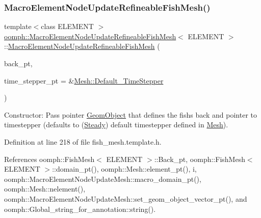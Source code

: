 \subsubsection{\texorpdfstring{Macro\+Element\+Node\+Update\+Refineable\+Fish\+Mesh()}{MacroElementNodeUpdateRefineableFishMesh()}}
{\footnotesize\ttfamily template$<$class E\+L\+E\+M\+E\+NT $>$ \\
\hyperlink{classoomph_1_1MacroElementNodeUpdateRefineableFishMesh}{oomph\+::\+Macro\+Element\+Node\+Update\+Refineable\+Fish\+Mesh}$<$ E\+L\+E\+M\+E\+NT $>$\+::\hyperlink{classoomph_1_1MacroElementNodeUpdateRefineableFishMesh}{Macro\+Element\+Node\+Update\+Refineable\+Fish\+Mesh} (\begin{DoxyParamCaption}\item[{\hyperlink{classoomph_1_1GeomObject}{Geom\+Object} $\ast$}]{back\+\_\+pt,  }\item[{\hyperlink{classoomph_1_1TimeStepper}{Time\+Stepper} $\ast$}]{time\+\_\+stepper\+\_\+pt = {\ttfamily \&\hyperlink{classoomph_1_1Mesh_a12243d0fee2b1fcee729ee5a4777ea10}{Mesh\+::\+Default\+\_\+\+Time\+Stepper}} }\end{DoxyParamCaption})\hspace{0.3cm}{\ttfamily [inline]}}



Constructor\+: Pass pointer \hyperlink{classoomph_1_1GeomObject}{Geom\+Object} that defines the fish\textquotesingle{}s back and pointer to timestepper (defaults to (\hyperlink{classoomph_1_1Steady}{Steady}) default timestepper defined in \hyperlink{classoomph_1_1Mesh}{Mesh}). 



Definition at line 218 of file fish\+\_\+mesh.\+template.\+h.



References oomph\+::\+Fish\+Mesh$<$ E\+L\+E\+M\+E\+N\+T $>$\+::\+Back\+\_\+pt, oomph\+::\+Fish\+Mesh$<$ E\+L\+E\+M\+E\+N\+T $>$\+::domain\+\_\+pt(), oomph\+::\+Mesh\+::element\+\_\+pt(), i, oomph\+::\+Macro\+Element\+Node\+Update\+Mesh\+::macro\+\_\+domain\+\_\+pt(), oomph\+::\+Mesh\+::nelement(), oomph\+::\+Macro\+Element\+Node\+Update\+Mesh\+::set\+\_\+geom\+\_\+object\+\_\+vector\+\_\+pt(), and oomph\+::\+Global\+\_\+string\+\_\+for\+\_\+annotation\+::string().

\mbox{\label{classoomph_1_1MacroElementNodeUpdateRefineableFishMesh_a68cdd294ca61ad64dbcd1313356d2ca4}} 
